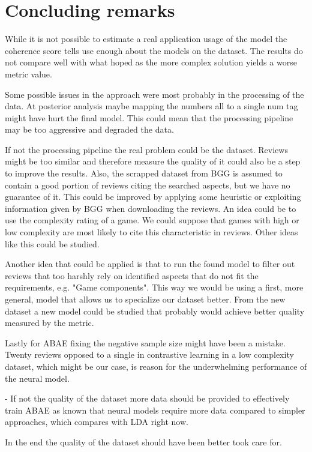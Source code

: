 \section{Concluding remarks}

While it is not possible to estimate a real application usage of the model the
coherence score tells use enough about the models on the dataset.
The results do not compare well with what hoped as the more complex solution yields a worse metric value.

Some possible issues in the approach were most probably in the processing of the data.
At posterior analysis maybe mapping the numbers all to a single num tag might have hurt the final model.
This could mean that the processing pipeline may be too aggressive and degraded the data.

If not the processing pipeline the real problem could be the dataset.
Reviews might be too similar and therefore measure the quality of it could also be a step to improve the results.
Also, the scrapped dataset from BGG is assumed to contain a good portion of reviews citing the searched aspects,
but we have no guarantee of it.
This could be improved by applying some heuristic or exploiting information given by BGG when downloading the reviews.
An idea could be to use the complexity rating of a game.
We could suppose that games with high or low complexity are most likely to cite this characteristic in reviews.
Other ideas like this could be studied.


Another idea that could be applied is that to run the found model to filter out reviews that too harshly rely
on identified aspects that do not fit the requirements, e.g. "Game components".
This way we would be using a first, more general, model that allows us to specialize our dataset better.
From the new dataset a new model could be studied that probably would achieve better quality measured by the metric.

Lastly for ABAE fixing the negative sample size might have been a mistake.
Twenty reviews opposed to a single in contrastive learning in a low complexity dataset, which
might be our case, is reason for the underwhelming performance of the neural model.

- If not the quality of the dataset more data should be provided to effectively train ABAE as known
that neural models require more data compared to simpler approaches, which compares with LDA right now.


In the end the quality of the dataset should have been better took care for.